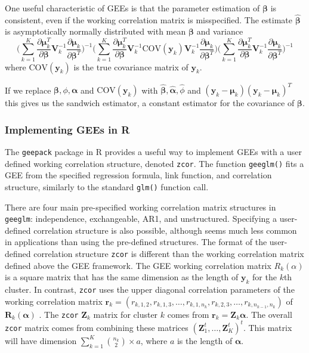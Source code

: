 \documentclass[12pt]{article}
\begin{document}
One useful characteristic of GEEs is that the parameter estimation of $\boldsymbol\beta$ is consistent, even if the working correlation matrix is misspecified. The estimate $\hat{\boldsymbol\beta}$ is asymptotically normally distributed with mean $\boldsymbol\beta$ and variance
$$ \big(\sum_{k=1}^K  \frac{\partial  \boldsymbol{\mu}_k^T }{\partial \boldsymbol\beta } \mathbf{V}_k^{-1} \frac{\partial  \boldsymbol\mu_k }{\partial \boldsymbol\beta^T } \big)^{-1} \bigg(\sum_{k=1}^K  \frac{\partial  \boldsymbol\mu_k^T }{\partial \boldsymbol\beta } \mathbf{V}_k^{-1}\text{COV}(\mathbf{y}_k)\mathbf{V}_{k}^{-1}  \frac{\partial  \boldsymbol\mu_k }{\partial \boldsymbol\beta^T } \bigg)\big(\sum_{k=1}^K  \frac{\partial  \boldsymbol\mu_k^T }{\partial \boldsymbol\beta } \mathbf{V}_k^{-1} \frac{\partial  \boldsymbol\mu_k }{\partial \boldsymbol\beta^T } \big)^{-1}$$
where $\text{COV}(\mathbf{y}_k)$ is the true covariance matrix of $\mathbf{y}_k$.

If we replace $ \boldsymbol\beta, \phi, \boldsymbol\alpha$ and $\text{COV}(\mathbf{y}_k)$ with $\hat{\boldsymbol\beta}, \hat {\boldsymbol\alpha}, \hat \phi$ and $(\mathbf{y}_k - \boldsymbol\mu_k)(\mathbf{y}_k- \boldsymbol\mu_k)^T$ this gives us the sandwich estimator, a constant estimator for the covariance of $\boldsymbol\beta$.


\subsubsection{Implementing GEEs in R}

The \texttt{geepack} package \cite{geepack} in R \cite{R} provides a useful way to implement GEEs with a user defined working correlation structure, denoted \texttt{zcor}. The function \texttt{geeglm()} fits a GEE from the specified regression formula, link function, and correlation structure, similarly to the standard \texttt{glm()} function call.

There are four main pre-specified working correlation matrix structures in \texttt{geeglm}: independence, exchangeable, AR1, and unstructured. Specifying a user-defined correlation structure is also possible, although seems much less common in applications than using the pre-defined structures. The format of the user-defined correlation structure \texttt{zcor} is different than the working correlation matrix defined above the GEE framework. The GEE working correlation matrix $R_k(\alpha)$ is a square matrix that has the same dimension as the length of $\mathbf{y}_k$ for the $k$th cluster. In contrast, \texttt{zcor} uses the upper diagonal correlation parameters of the working correlation matrix $\mathbf{r}_k = (r_{k, 1,2}, r_{k,1,3}, \ldots , r_{k,1,n_k}, r_{k,2,3}, \ldots , r_{k,n_{k-1},n_k})$ of $\mathbf{R}_{k}(\boldsymbol\alpha)$ . The \texttt{zcor} $\textbf{Z}_k$ matrix for cluster $k$ comes from $\textbf{r}_k = \textbf{Z}_k \boldsymbol\alpha$. The overall \texttt{zcor} matrix comes from combining these matrices $(\textbf{Z}_1^t, \ldots , \textbf{Z}_K^t)^t$. This matrix will have dimension $\sum_{k=1}^K \binom{n_k}{2} \times a$, where $a$ is the length of $\boldsymbol\alpha$.
\end{document}
